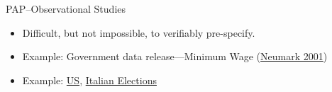 \documentclass[aspectratio=169]{beamer}
\begin{document}
\begin{frame}{PAP--Observational Studies}
\begin{itemize}[<.->]
\item Difficult, but not impossible, to verifiably pre-specify.
\item Example: Government data release---Minimum Wage (\href{http://onlinelibrary.wiley.com/doi/10.1111/0019-8676.00199/full}{Neumark 2001})
\item Example: \href{https://www.erpc2016.com/}{US}, \href{http://www.itanes.org/2016/11/21/2016-italian-constitutional-referendum-research-preacceptance-competition/}{Italian Elections}
\end{itemize}
\end{frame}
\end{document}
